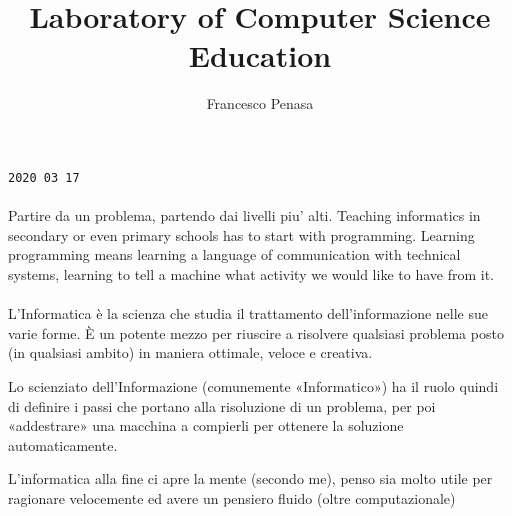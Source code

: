 \documentclass[11pt]{article}
\begin{document}
\author{Francesco Penasa}
\title{Laboratory of Computer Science Education}
\maketitle

\medskip

\texttt{2020 03 17}
\paragraph{} 
\label{par:1}
Partire da un problema, partendo dai livelli piu' alti.
Teaching informatics in secondary or even primary schools has to start with programming. Learning programming means learning a language of communication with technical systems, learning to tell a machine what activity we would like to have from it.

\paragraph{} 
\label{par:2}
L’Informatica è la scienza che studia il trattamento dell’informazione nelle sue varie forme. È un potente mezzo per riuscire a risolvere qualsiasi problema posto (in qualsiasi ambito) in maniera ottimale, veloce e creativa.

Lo scienziato dell’Informazione (comunemente «Informatico») ha il ruolo quindi di definire i passi che portano alla risoluzione di un problema, per poi «addestrare» una macchina a compierli per ottenere la soluzione automaticamente.

L'informatica alla fine ci apre la mente (secondo me), penso sia molto utile per ragionare velocemente ed avere un pensiero fluido (oltre computazionale)
\end{document}
